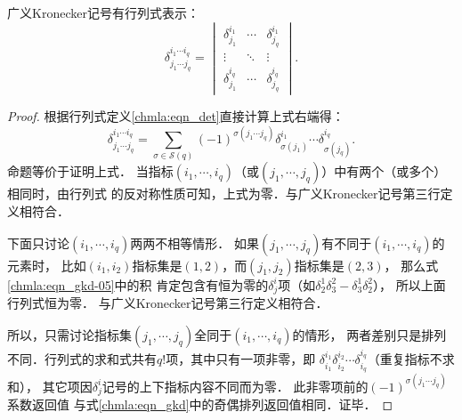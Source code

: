 

\begin{proposition}
    广义Kronecker记号有行列式表示：
    \begin{equation}\label{chmla:eqn_kronecker-det}
        \delta_{j_1 \cdots j_q}^{i_1 \cdots i_q} =
        \begin{vmatrix}
            \delta_{j_1}^{i_1} & \cdots & \delta_{j_q}^{i_1} \\
            \vdots & \ddots   & \vdots \\
            \delta_{j_1}^{i_q} & \cdots & \delta_{j_q}^{i_q}
        \end{vmatrix} .
    \end{equation}
\end{proposition}
\begin{proof}
根据行列式定义\eqref{chmla:eqn_det}直接计算上式右端得：
\begin{equation}\label{chmla:eqn_gkd-05}
    \delta_{j_1 \cdots j_q}^{i_1 \cdots i_q} =
    \sum_{\sigma \in \mathscr{S}(q)} (-1)^{\sigma(j_1  \cdots j_q)}
    \delta^{i_1}_{\sigma(j_1)} \cdots \delta^{i_q}_{\sigma(j_q)}.
\end{equation}
命题等价于证明上式．
当指标$(i_1, \cdots, i_q)$（或$(j_1, \cdots, j_q)$）中有两个（或多个）相同时，由行列式
的反对称性质可知，上式为零．与广义Kronecker记号第三行定义相符合．

下面只讨论$(i_1, \cdots, i_q)$两两不相等情形．
如果$(j_1, \cdots, j_q)$有不同于$(i_1, \cdots, i_q)$的元素时，
比如$(i_1, i_2)$指标集是$(1,2)$，而$(j_1, j_2)$指标集是$(2, 3)$，
那么式\eqref{chmla:eqn_gkd-05}中的积
肯定包含有恒为零的$\delta^i_j$项（如$\delta^1_2 \delta^2_3-\delta^1_3 \delta^2_2$），
所以上面行列式恒为零．
与广义Kronecker记号第三行定义相符合．

所以，只需讨论指标集$(j_1, \cdots, j_q)$全同于$(i_1, \cdots, i_q)$的情形，
两者差别只是排列不同．行列式的求和式共有$q!$项，其中只有一项非零，即
$\delta_{i_1}^{i_1} \delta_{i_2}^{i_2} \cdots \delta_{i_q}^{i_q}$（重复指标不求和），
其它项因$\delta^i_j$记号的上下指标内容不同而为零．
此非零项前的$(-1)^{\sigma(j_1  \cdots j_q)}$系数返回值
与式\eqref{chmla:eqn_gkd}中的奇偶排列返回值相同．证毕．
\end{proof}
